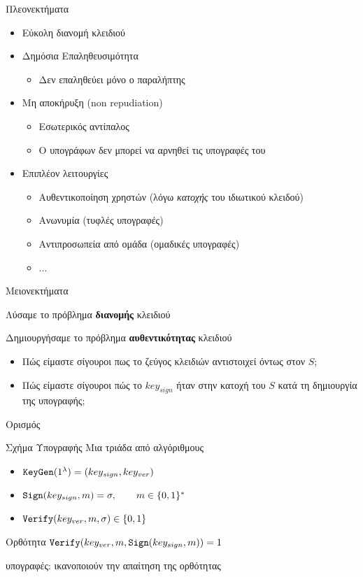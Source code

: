 \documentclass[handout]{beamer}
\begin{document}
\begin{frame}{Πλεονεκτήματα}
 
\begin{itemize}
\item Εύκολη διανομή κλειδιού
\pause
\item Δημόσια Επαληθευσιμότητα
\begin{itemize}
\item Δεν επαληθεύει μόνο ο παραλήπτης
\end{itemize}
\pause
\item Μη αποκήρυξη (non repudiation)
\begin{itemize}
\item Εσωτερικός αντίπαλος
\item Ο υπογράφων δεν μπορεί να αρνηθεί τις υπογραφές του
\end{itemize}
\pause
\item Επιπλέον λειτουργίες
\begin{itemize}
    \item Αυθεντικοποίηση χρηστών (λόγω \emph{κατοχής} του ιδιωτικού κλειδού)
    \pause
    \item Ανωνυμία (τυφλές υπογραφές)
    \pause
    \item Αντιπροσωπεία από ομάδα (ομαδικές υπογραφές)
    \item ...
\end{itemize}
\end{itemize}
\end{frame}

\begin{frame}{Μειονεκτήματα}

Λύσαμε το πρόβλημα \textbf{διανομής} κλειδιού

Δημιουργήσαμε το πρόβλημα \textbf{αυθεντικότητας} κλειδιού

\begin{itemize}
\item \alert{Πώς είμαστε σίγουροι πως το ζεύγος κλειδιών αντιστοιχεί όντως στον $S$;}
\pause
\item \alert{Πώς είμαστε σίγουροι πώς το $key_{sign}$ ήταν στην κατοχή του $S$ κατά τη δημιουργία της υπογραφής;}
\end{itemize}
 
\end{frame}

\begin{frame}{Ορισμός}
\begin{block}{Σχήμα Υπογραφής}
Μια τριάδα από αλγόριθμους
\begin{itemize}
\item $\mathtt{KeyGen}(1^\lambda) = (key_{sign},key_{ver})$
\pause
\item $\mathtt{Sign}(key_{sign}, m) = \sigma, \quad\quad m \in \{0,1\}^*$
\pause
\item $\mathtt{Verify}(key_{ver}, m, \sigma) \in \{0,1\}$
\end{itemize}
\end{block}
\pause
\begin{block}{Ορθότητα}
$\mathtt{Verify}(key_{ver}, m, \mathtt{Sign}(key_{sign}, m))=1$
\end{block}
\pause
{} υπογραφές: ικανοποιούν την απαίτηση της ορθότητας

\end{frame}
\end{document}
